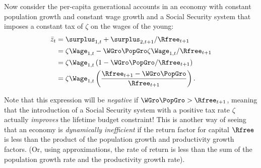 \documentclass{handout}
\begin{document}
Now consider the per-capita generational accounts in an economy with 
constant population growth and constant wage growth and a Social 
Security system that imposes a constant tax of $\zeta$ on the wages of 
the young:
\begin{equation}\begin{gathered}\begin{aligned}
        \bar{z}_{t} & =  \surplus_{1,t}+\surplus_{2,t+1}/\Rfree_{t+1}
\\   & =  \zeta \Wage_{1,t}- {\WGro}\PopGro \zeta \Wage_{1,t}/\Rfree_{t+1}
\\   & =  \zeta \Wage_{1,t}\left(1 - {\WGro}\PopGro/\Rfree_{t+1}\right)
\\   & =  \zeta \Wage_{1,t}\left(\frac{\Rfree_{t+1} - {\WGro}\PopGro}{\Rfree_{t+1}}\right).
\end{aligned}\end{gathered}\end{equation}

Note that this expression will be {\it negative} if ${\WGro}\PopGro>\Rfree_{t+1}$, meaning 
that the introduction of a Social Security system with a positive tax 
rate $\zeta$ actually {\it improves} the lifetime budget constraint!  
This is another way of seeing that an economy is {\it dynamically 
inefficient} if the return factor for capital $\Rfree$ is less than the 
product of the population growth and productivity growth factors.  (Or, using approximations,
the rate of return is less than the sum of the population growth rate and the productivity growth rate).




  

\end{document}
